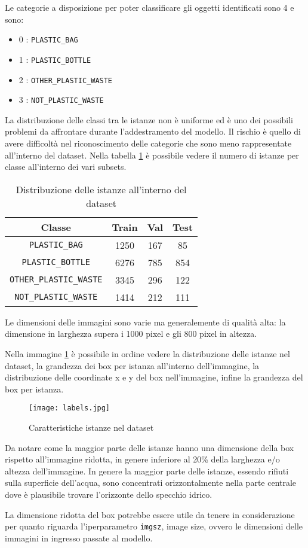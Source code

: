 Le categorie a disposizione per poter classificare gli oggetti identificati sono 4 e sono:

\begin{itemize}
    \item 0 : \verb+PLASTIC_BAG+
    \item 1 : \verb+PLASTIC_BOTTLE+
    \item 2 : \verb+OTHER_PLASTIC_WASTE+
    \item 3 : \verb+NOT_PLASTIC_WASTE+
\end{itemize}

La distribuzione delle classi tra le istanze non è uniforme ed è uno dei possibili problemi da affrontare durante l'addestramento del modello.
Il rischio è quello di avere difficoltà nel riconoscimento delle categorie che sono meno rappresentate all'interno del dataset.
Nella tabella \ref{table:2} è possibile vedere il numero di istanze per classe all'interno dei vari subsets.

\begin{table}[h!]
    \centering
    \begin{tabular}{ |c|c|c|c| } 
    \hline
    \textbf{Classe} & \textbf{Train} & \textbf{Val} & \textbf{Test} \\ 
    \hline
    \verb+PLASTIC_BAG+ & 1250 & 167 & 85 \\ 
    \verb+PLASTIC_BOTTLE+ & 6276 & 785 & 854 \\ 
    \verb+OTHER_PLASTIC_WASTE+ & 3345 & 296 & 122 \\ 
    \verb+NOT_PLASTIC_WASTE+ & 1414 & 212 & 111 \\
    \hline
    \end{tabular}
    \caption{Distribuzione delle istanze all'interno del dataset}
\label{table:2}
\end{table}

Le dimensioni delle immagini sono varie ma generalemente di qualità alta: la dimensione in larghezza supera i 1000 pixel e gli 800 pixel in altezza.

Nella immagine \ref{fig:1} è possibile in ordine vedere la distribuzione delle istanze nel dataset, la grandezza dei box per istanza all'interno dell'immagine, la distribuzione delle coordinate x e y del box nell'immagine, infine la grandezza del box per istanza.

\begin{figure}[h]
    \centering
    \texttt{[image: labels.jpg]}
    \caption{Caratteristiche istanze nel dataset}
    \label{fig:1}
    \end{figure}

Da notare come la maggior parte delle istanze hanno una dimensione della box rispetto all'immagine ridotta, in genere inferiore al 20\% della larghezza e/o altezza dell'immagine. In genere la maggior parte delle istanze, essendo rifiuti sulla superficie dell'acqua, sono concentrati orizzontalmente nella parte centrale dove è plausibile trovare l'orizzonte dello specchio idrico.

La dimensione ridotta del box potrebbe essere utile da tenere in considerazione per quanto riguarda l'iperparametro \verb+imgsz+, image size, ovvero le dimensioni delle immagini in ingresso passate al modello.
